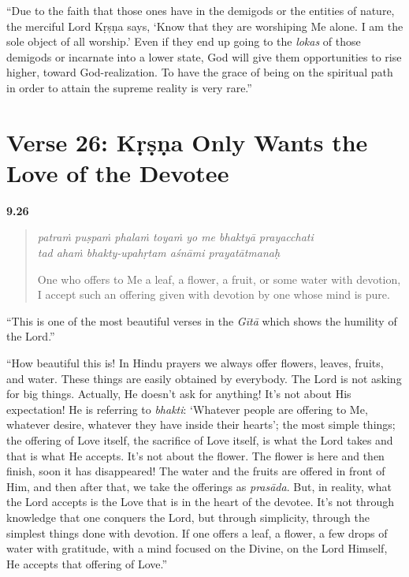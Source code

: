 \enquote{Due to the faith that those ones have in the demigods or the entities of nature, the merciful Lord Kṛṣṇa says, \enquote{Know that they are worshiping Me alone. I am the sole object of all worship.} Even if they end up going to the \textit{lokas} of those demigods or incarnate into a lower state, God will give them opportunities to rise higher, toward God-realization. To have the grace of being on the spiritual path in order to attain the supreme reality is very rare.}

\section{Verse 26: Kṛṣṇa Only Wants the Love of the Devotee}\label{sec-verse-26-krsna-only-wants-the-love-of-the-devotee}


\par\noindent\textbf{9.26}\par
\begin{verse}
\textit{patraṁ puṣpaṁ phalaṁ toyaṁ yo me bhaktyā prayacchati} \\
\textit{tad ahaṁ bhakty-upahṛtam aśnāmi prayatātmanaḥ}

\noindent One who offers to Me a leaf, a flower, a fruit, or some water with devotion, I accept such an offering given with devotion by one whose mind is pure.
\end{verse}
\par


\enquote{This is one of the most beautiful verses in the \textit{Gītā} which shows the humility of the Lord.}

\enquote{How beautiful this is! In Hindu prayers we always offer flowers, leaves, fruits, and water. These things are easily obtained by everybody. The Lord is not asking for big things. Actually, He doesn’t ask for anything! It’s not about His expectation! He is referring to \textit{bhakti}: \enquote{Whatever people are offering to Me, whatever desire, whatever they have inside their hearts}; the most simple things; the offering of Love itself, the sacrifice of Love itself, is what the Lord takes and that is what He accepts. It’s not about the flower. The flower is here and then finish, soon it has disappeared! The water and the fruits are offered in front of Him, and then after that, we take the offerings as \textit{prasāda}. But, in reality, what the Lord accepts is the Love that is in the heart of the devotee. It’s not through knowledge that one conquers the Lord, but through simplicity, through the simplest things done with devotion. If one offers a leaf, a flower, a few drops of water with gratitude, with a mind focused on the Divine, on the Lord Himself, He accepts that offering of Love.}

